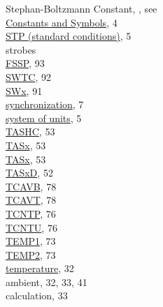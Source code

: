 \documentclass[
]{article}
\begin{document}
Stephan-Boltzmann Constant, , see\\
\hspace*{0.333em}\hspace*{0.333em}\href{./1-introduction.html\#constants-and-symbols}{Constants
and Symbols}, 4\\
\href{./2-general-information-about-data-files.html\#units-and-abbreviations}{STP
(standard conditions)}, 5\\
strobes\\
\hspace*{0.333em}\hspace*{0.333em}\href{./10-obsolete-variables.html\#fstrob}{FSSP},
93\\
\href{./10-obsolete-variables.html\#swtc}{SWTC}, 92\\
\href{./10-obsolete-variables.html\#swx}{SWx}, 91\\
\href{./2-general-information-about-data-files.html\#synchronization-of-measurements}{synchronization},
7\\
\href{./2-general-information-about-data-files.html\#units-and-abbreviations}{system
of units}, 5\\
\href{./4-the-state-of-the-atmosphere.html\#tashc}{TASHC}, 53\\
\href{./4-the-state-of-the-atmosphere.html\#true-airspeed\%7C}{TASx},
53\\
\href{./4-the-state-of-the-atmosphere.html\#true-airspeed}{TASx}, 53\\
\href{./4-the-state-of-the-atmosphere.html\#true-airspeed}{TASxD}, 52\\
\href{./8-radiation-variables.html\#rstx}{TCAVB}, 78\\
\href{./8-radiation-variables.html\#rstx}{TCAVT}, 78\\
\href{./7-aerosol-particle-measurements.html\#tcntu-tcntp}{TCNTP}, 76\\
\href{./7-aerosol-particle-measurements.html\#tcntu-tcntp}{TCNTU}, 76\\
\href{./7-aerosol-particle-measurements.html\#cntemp}{TEMP1}, 73\\
\href{./7-aerosol-particle-measurements.html\#cntemp}{TEMP2}, 73\\
\href{./4-the-state-of-the-atmosphere.html\#ambient-t}{temperature},
32\\
\hspace*{0.333em}\hspace*{0.333em}ambient, 32, 33, 41\\
\hspace*{0.333em}\hspace*{0.333em}calculation, 33\\
\end{document}
